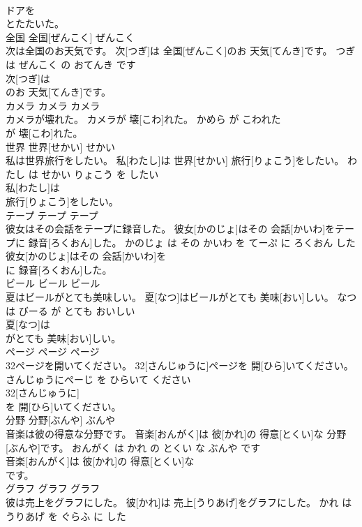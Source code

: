 \documentclass[8pt]{extreport}
\begin{document}
\begin{CJK}{UTF8}{min}
\\	ドアを
\\	とたたいた。			
\\	全国	全国[ぜんこく]	ぜんこく	
\\	次は全国のお天気です。	次[つぎ]は 全国[ぜんこく]のお 天気[てんき]です。	つぎ は ぜんこく の おてんき です	
\\	次[つぎ]は
\\	のお 天気[てんき]です。			
\\	カメラ	カメラ	カメラ	
\\	カメラが壊れた。	カメラが 壊[こわ]れた。	かめら が こわれた	
\\	が 壊[こわ]れた。			
\\	世界	世界[せかい]	せかい	
\\	私は世界旅行をしたい。	私[わたし]は 世界[せかい] 旅行[りょこう]をしたい。	わたし は せかい りょこう を したい	
\\	私[わたし]は
\\	旅行[りょこう]をしたい。			
\\	テープ	テープ	テープ	
\\	彼女はその会話をテープに録音した。	彼女[かのじょ]はその 会話[かいわ]をテープに 録音[ろくおん]した。	かのじょ は その かいわ を てーぷ に ろくおん した	
\\	彼女[かのじょ]はその 会話[かいわ]を
\\	に 録音[ろくおん]した。			
\\	ビール	ビール	ビール	
\\	夏はビールがとても美味しい。	夏[なつ]はビールがとても 美味[おい]しい。	なつ は びーる が とても おいしい	
\\	夏[なつ]は
\\	がとても 美味[おい]しい。			
\\	ページ	ページ	ページ	
\\	32ページを開いてください。	32[さんじゅうに]ページを 開[ひら]いてください。	さんじゅうにぺーじ を ひらいて ください	
\\	32[さんじゅうに]
\\	を 開[ひら]いてください。			
\\	分野	分野[ぶんや]	ぶんや	
\\	音楽は彼の得意な分野です。	音楽[おんがく]は 彼[かれ]の 得意[とくい]な 分野[ぶんや]です。	おんがく は かれ の とくい な ぶんや です	
\\	音楽[おんがく]は 彼[かれ]の 得意[とくい]な
\\	です。			
\\	グラフ	グラフ	グラフ	
\\	彼は売上をグラフにした。	彼[かれ]は 売上[うりあげ]をグラフにした。	かれ は うりあげ を ぐらふ に した	

\end{CJK}
\end{document}
